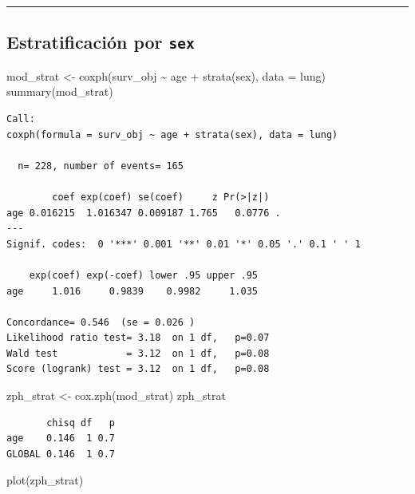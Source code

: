 \documentclass[
]{article}
\newenvironment{Shaded}{\begin{snugshade}}{\end{snugshade}}
\newcommand{\AttributeTok}[1]{\textcolor[rgb]{0.40,0.45,0.13}{#1}}
\newcommand{\FunctionTok}[1]{\textcolor[rgb]{0.28,0.35,0.67}{#1}}
\newcommand{\NormalTok}[1]{\textcolor[rgb]{0.00,0.23,0.31}{#1}}
\newcommand{\OtherTok}[1]{\textcolor[rgb]{0.00,0.23,0.31}{#1}}
\newcommand{\SpecialCharTok}[1]{\textcolor[rgb]{0.37,0.37,0.37}{#1}}
\begin{document}
\begin{center}\rule{0.5\linewidth}{0.5pt}\end{center}

\subsection{\texorpdfstring{Estratificación por
\texttt{sex}}{Estratificación por sex}}\label{estratificaciuxf3n-por-sex}

\begin{Shaded}
\begin{Highlighting}[]
\NormalTok{mod\_strat }\OtherTok{\textless{}{-}} \FunctionTok{coxph}\NormalTok{(surv\_obj }\SpecialCharTok{\textasciitilde{}}\NormalTok{ age }\SpecialCharTok{+} \FunctionTok{strata}\NormalTok{(sex), }\AttributeTok{data =}\NormalTok{ lung)}
\FunctionTok{summary}\NormalTok{(mod\_strat)}
\end{Highlighting}
\end{Shaded}

\begin{verbatim}
Call:
coxph(formula = surv_obj ~ age + strata(sex), data = lung)

  n= 228, number of events= 165 

        coef exp(coef) se(coef)     z Pr(>|z|)  
age 0.016215  1.016347 0.009187 1.765   0.0776 .
---
Signif. codes:  0 '***' 0.001 '**' 0.01 '*' 0.05 '.' 0.1 ' ' 1

    exp(coef) exp(-coef) lower .95 upper .95
age     1.016     0.9839    0.9982     1.035

Concordance= 0.546  (se = 0.026 )
Likelihood ratio test= 3.18  on 1 df,   p=0.07
Wald test            = 3.12  on 1 df,   p=0.08
Score (logrank) test = 3.12  on 1 df,   p=0.08
\end{verbatim}

\begin{Shaded}
\begin{Highlighting}[]
\NormalTok{zph\_strat }\OtherTok{\textless{}{-}} \FunctionTok{cox.zph}\NormalTok{(mod\_strat)}
\NormalTok{zph\_strat}
\end{Highlighting}
\end{Shaded}

\begin{verbatim}
       chisq df   p
age    0.146  1 0.7
GLOBAL 0.146  1 0.7
\end{verbatim}

\begin{Shaded}
\begin{Highlighting}[]
\FunctionTok{plot}\NormalTok{(zph\_strat)}
\end{Highlighting}
\end{Shaded}
\end{document}
